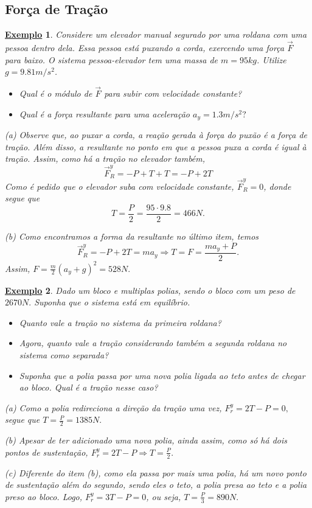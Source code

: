 \documentclass{article}
\newtheorem{example}{\underline{Exemplo}}
\begin{document}
 \subsection{For\c ca de Tra\c c\~ao}
   \begin{example}
    Considere um elevador manual segurado por uma roldana com uma pessoa dentro dela. Essa pessoa est\'a puxando a corda, exercendo
    uma for\c ca $\vec{F}$ para baixo. O sistema pessoa-elevador tem uma massa de $m=95kg$. Utilize $g=9.81m/s^{2}$.
   \begin{itemize}
     \item[a)] Qual \'e o m\'odulo de $\vec{F}$ para subir com velocidade constante?
       \item[b)] Qual \'e a for\c ca resultante para uma acelera\c c\~ao $a_{y}=1.3m/s^{2}?$
   \end{itemize}

   (a) Observe que, ao puxar a corda, a rea\c c\~ao gerada \`a for\c ca do pux\~ao \'e a for\c ca de tra\c c\~ao. Al\'em disso,
   a resultante no ponto em que a pessoa puxa a corda \'e igual \`a tra\c c\~ao. Assim, como h\'a a tra\c c\~ao no elevador tamb\'em, 
     $$
   \vec{F}_{R}^{y}= -P + T + T = -P + 2T 
     $$
     Como \'e pedido que o elevador suba com velocidade constante, $\vec{F}_{R}^{y} = 0$, donde segue que 
       $$
         T = \frac{P}{2} = \frac{95 \cdot 9.8}{2} = 466N.
       $$

  (b) Como encontramos a forma da resultante no \'ultimo item, temos 
    $$
      \vec{F}_{R}^{y} = - P + 2T = ma_{y} \Rightarrow T = F = \frac{ma_{y}+P}{2}.
    $$
    Assim, $F = \frac{m}{2}(a_{y}+g)^{2} = 528N.$
   \end{example} 

  \begin{example}
    Dado um bloco e multiplas polias, sendo o bloco com um peso de $2670N.$ Suponha que o sistema est\'a em equil\'ibrio.
   \begin{itemize}
     \item[a)] Quanto vale a tra\c c\~ao no sistema da primeira roldana?
     \item[b)] Agora, quanto vale a tra\c c\~ao considerando tamb\'em a segunda roldana no sistema como separada?
     \item[c)] Suponha que a polia passa por uma nova polia ligada ao teto antes de chegar ao bloco. Qual \'e a tra\c c\~ao nesse caso?
   \end{itemize}

   (a) Como a polia redireciona a dire\c c\~ao da tra\c c\~ao uma vez, $F_{r}^{y} = 2T - P = 0,$ segue que $T = \frac{P}{2} = 1385N.$

   (b) Apesar de ter adicionado uma nova polia, ainda assim, como s\'o h\'a dois pontos de sustenta\c c\~ao, $F_{r}^{y} = 2T - P \Rightarrow T = \frac{P}{2}.$

   (c) Diferente do item (b), como ela passa por mais uma polia, h\'a um novo ponto de sustenta\c c\~ao al\'em do segundo, sendo eles
   o teto, a polia presa ao teto e a polia preso ao bloco. Logo, $F_{r}^{y} = 3T - P = 0$, ou seja, $T = \frac{P}{3} = 890N.$
  \end{example}
\end{document}
